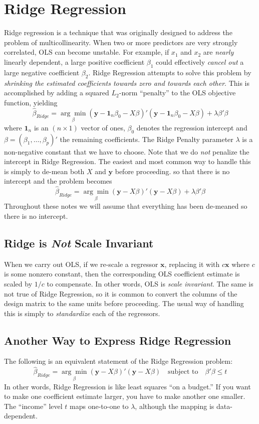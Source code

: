 \section{Ridge Regression} 
Ridge regression is a technique that was originally designed to address the problem of multicollinearity. When two or more predictors are very strongly correlated, OLS can become unstable. For example, if $x_1$ and $x_2$ are \emph{nearly} linearly dependent, a large positive coefficient $\beta_1$ could effectively \emph{cancel out} a large negative coefficient $\beta_2$. Ridge Regression attempts to solve this problem by \emph{shrinking the estimated coefficients towards zero and towards each other}. This is accomplished by adding a squared $L_2$-norm ``penalty'' to the OLS objective function, yielding
	$$\widehat{\beta}_{Ridge} =\underset{\beta}{\arg \min} (\mathbf{y} - \textbf{1}_n\beta_0 - X\beta)' (\mathbf{y} - \textbf{1}_n \beta_0 - X\beta) + \lambda \beta'\beta$$
where $\textbf{1}_n$ is an $(n\times 1)$ vector of ones, $\beta_0$ denotes the regression intercept and $\beta = (\beta_1, \hdots, \beta_p)'$ the remaining coefficients. The Ridge Penalty parameter $\lambda$ is a non-negative constant that we have to choose. Note that we do \emph{not} penalize the intercept in Ridge Regression. The easiest and most common way to handle this is simply to de-mean both $X$ and $\mathbf{y}$ before proceeding. so that there is no intercept and the problem becomes
	$$\widehat{\beta}_{Ridge} =\underset{\beta}{\arg \min}(\mathbf{y} - X\beta)' (\mathbf{y} - X\beta) + \lambda \beta'\beta$$
Throughout these notes we will assume that everything has been de-meaned so there is no intercept.

\subsection{Ridge is \emph{Not} Scale Invariant} When we carry out OLS, if we re-scale a regressor $\mathbf{x}$, replacing it with $c \mathbf{x}$ where $c$ is some nonzero constant, then the corresponding OLS coefficient estimate is scaled by $1/c$ to compensate. In other words, OLS is \emph{scale invariant}. The same is not true of Ridge Regression, so it is common to convert the columns of the design matrix to the same units before proceeding. The usual way of handling this is simply to \emph{standardize} each of the regressors.

\subsection{Another Way to Express Ridge Regression}
The following is an equivalent statement of the Ridge Regression problem:
$$\widehat{\beta}_{Ridge} = \underset{\beta}{\arg \min}(\mathbf{y} - X\beta)' (\mathbf{y} - X\beta) \quad \mbox{subject to} \quad \beta'\beta \leq t$$
In other words, Ridge Regression is like least squares ``on a budget.'' If you want to make one coefficient estimate larger, you have to make another one smaller. The ``income'' level $t$ maps one-to-one to $\lambda$, although the mapping is data-dependent.

